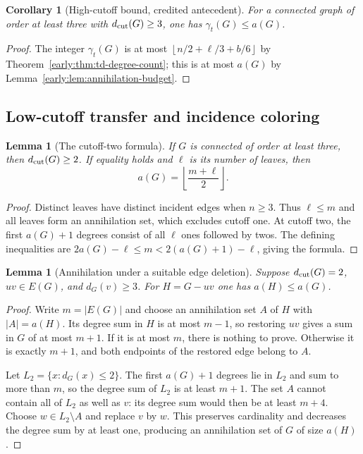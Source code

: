 \documentclass[11pt,a4paper]{article}
\newtheorem{lemma}[theorem]{Lemma}
\newtheorem{corollary}[theorem]{Corollary}
\theoremstyle{definition}\newtheorem{definition}[theorem]{Definition}
\theoremstyle{remark}\newtheorem{remark}[theorem]{Remark}
\newcommand{\floor}[1]{\left\lfloor#1\right\rfloor}
\begin{document}
\begin{corollary}[High-cutoff bound, credited antecedent]
\label{early:cor:high-cutoff}
For a connected graph of order at least three with
$d_{\rm cut}(G)\geq3$, one has $\gamma_t(G)\leq a(G)$.
\end{corollary}
\begin{proof}
The integer $\gamma_t(G)$ is at most
$\floor{n/2+\ell/3+b/6}$ by
Theorem~\ref{early:thm:td-degree-count}; this is at most $a(G)$ by
Lemma~\ref{early:lem:annihilation-budget}.
\end{proof}

\subsection{Low-cutoff transfer and incidence coloring}

\begin{lemma}[The cutoff-two formula]
\label{early:lem:cutoff-two}
If $G$ is connected of order at least three, then
$d_{\rm cut}(G)\geq2$.  If equality holds and $\ell$ is its
number of leaves, then
\[
 a(G)=\floor{\frac{m+\ell}{2}}.
\]
\end{lemma}
\begin{proof}
Distinct leaves have distinct incident edges when $n\geq3$.
Thus $\ell\leq m$ and all leaves form an annihilation set, which
excludes cutoff one.  At cutoff two, the first $a(G)+1$ degrees
consist of all $\ell$ ones followed by twos.  The defining
inequalities are
$2a(G)-\ell\leq m<2(a(G)+1)-\ell$, giving the formula.
\end{proof}

\begin{lemma}[Annihilation under a suitable edge deletion]
\label{early:lem:annihilation-transfer}
Suppose $d_{\rm cut}(G)=2$, $uv\in E(G)$, and $d_G(v)\geq3$.
For $H=G-uv$ one has $a(H)\leq a(G)$.
\end{lemma}
\begin{proof}
Write $m=|E(G)|$ and choose an annihilation set $A$ of $H$ with
$|A|=a(H)$.  Its degree sum in $H$ is at most $m-1$, so restoring
$uv$ gives a sum in $G$ of at most $m+1$.  If it is at most $m$,
there is nothing to prove.  Otherwise it is exactly $m+1$, and
both endpoints of the restored edge belong to $A$.

Let $L_2=\{x:d_G(x)\leq2\}$.  The first $a(G)+1$ degrees lie in
$L_2$ and sum to more than $m$, so the degree sum of $L_2$ is at
least $m+1$.  The set $A$ cannot contain all of $L_2$ as well as
$v$: its degree sum would then be at least $m+4$.  Choose
$w\in L_2\setminus A$ and replace $v$ by $w$.  This preserves
cardinality and decreases the degree sum by at least one, producing
an annihilation set of $G$ of size $a(H)$.
\end{proof}
\end{document}

